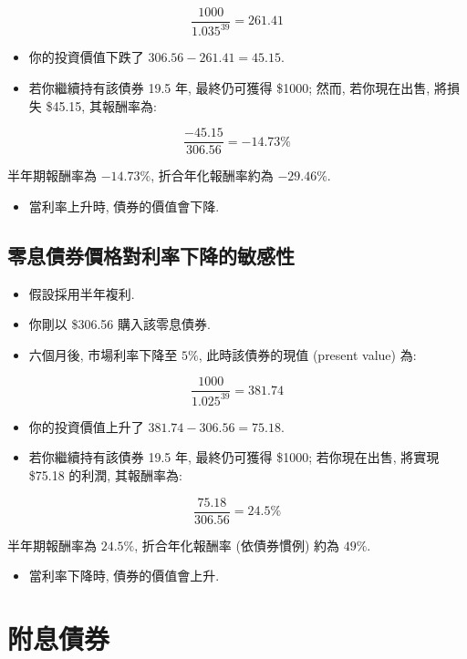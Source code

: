 \documentclass[letterpaper]{article}
\begin{document}
		$$
		\frac{1000}{1.035^{39}}=261.41
		$$
		
		\begin{itemize}
			\item 你的投資價值下跌了 \(306.56 - 261.41 = 45.15\).  
			\item 若你繼續持有該債券 19.5 年, 最終仍可獲得 \$1000; 然而, 若你現在出售, 將損失 \$45.15, 其報酬率為: 
		\end{itemize}
		
		$$
		\frac{-45.15}{306.56}=-14.73 \%
		$$
		
		半年期報酬率為 \(-14.73\%\), 折合年化報酬率約為 \(-29.46\%\).  
		
		\begin{itemize}
			\item 當利率上升時, 債券的價值會下降.
		\end{itemize}
		
		\subsection{零息債券價格對利率下降的敏感性}
		\begin{itemize}
			\item 假設採用半年複利.  
			\item 你剛以 \$306.56 購入該零息債券.  
			\item 六個月後, 市場利率下降至 \(5\%\), 此時該債券的現值 (present value) 為: 
		\end{itemize}
		
		$$
		\frac{1000}{1.025^{39}}=381.74
		$$
		
		\begin{itemize}
			\item 你的投資價值上升了 \(381.74 - 306.56 = 75.18\).  
			\item 若你繼續持有該債券 19.5 年, 最終仍可獲得 \$1000; 若你現在出售, 將實現 \$75.18 的利潤, 其報酬率為: 
		\end{itemize}
		
		$$
		\frac{75.18}{306.56}=24.5 \%
		$$
		
		半年期報酬率為 \(24.5\%\), 折合年化報酬率 (依債券慣例) 約為 \(49\%\).  
		
		\begin{itemize}
			\item 當利率下降時, 債券的價值會上升.  
		\end{itemize}
		
		\section{附息債券}
		
\end{document}
